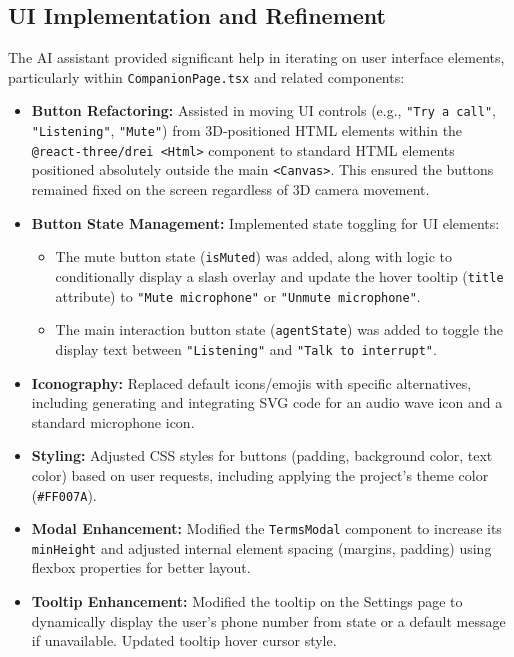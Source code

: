 \documentclass[11pt]{article} %
\begin{document}
\subsection*{UI Implementation and Refinement}
The AI assistant provided significant help in iterating on user interface elements, particularly within \texttt{CompanionPage.tsx} and related components:
\begin{itemize}
    \item \textbf{Button Refactoring:} Assisted in moving UI controls (e.g., \texttt{"Try a call"}, \texttt{"Listening"}, \texttt{"Mute"}) from 3D-positioned HTML elements within the \texttt{@react-three/drei <Html>} component to standard HTML elements positioned absolutely outside the main \texttt{<Canvas>}. This ensured the buttons remained fixed on the screen regardless of 3D camera movement.
    \item \textbf{Button State Management:} Implemented state toggling for UI elements:
    \begin{itemize}
        \item The mute button state (\texttt{isMuted}) was added, along with logic to conditionally display a slash overlay and update the hover tooltip (\texttt{title} attribute) to \texttt{"Mute microphone"} or \texttt{"Unmute microphone"}.
        \item The main interaction button state (\texttt{agentState}) was added to toggle the display text between \texttt{"Listening"} and \texttt{"Talk to interrupt"}.
    \end{itemize}
    \item \textbf{Iconography:} Replaced default icons/emojis with specific alternatives, including generating and integrating SVG code for an audio wave icon and a standard microphone icon.
    \item \textbf{Styling:} Adjusted CSS styles for buttons (padding, background color, text color) based on user requests, including applying the project's theme color (\texttt{\#FF007A}).
    \item \textbf{Modal Enhancement:} Modified the \texttt{TermsModal} component to increase its \texttt{minHeight} and adjusted internal element spacing (margins, padding) using flexbox properties for better layout.
    \item \textbf{Tooltip Enhancement:} Modified the tooltip on the Settings page to dynamically display the user's phone number from state or a default message if unavailable. Updated tooltip hover cursor style.
\end{itemize}
\end{document}
